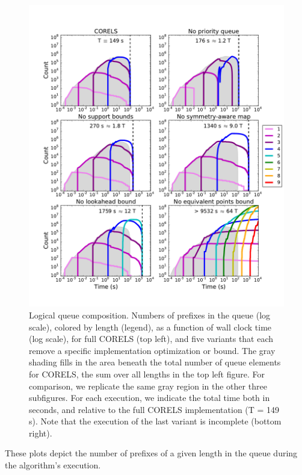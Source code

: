 \begin{figure}[t!]
\begin{center}
\includegraphics[trim={15mm 20mm 5mm 25mm},
width=\textwidth]{figs/kdd_compas_ablation-queue.pdf}
\end{center}
\vspace{-5mm}
\caption{Logical queue composition.
%
Numbers of prefixes in the queue (log scale), colored by length (legend),
as a function of wall clock time (log scale), for full CORELS (top left),
and five variants that each remove a specific implementation optimization or bound.
%
The gray shading fills in the area beneath the total number of
queue elements for CORELS,
\ie the sum over all lengths in the top left figure.
%
For comparison, we replicate the same gray region
in the other three subfigures.
%
For each execution, we indicate the total time both in seconds,
and relative to the full CORELS implementation (T = 149 s).
%
Note that the execution of the last variant is incomplete (bottom right).
}
\label{fig:queue}
\end{figure}
%
These plots depict the number of prefixes of a given length in the queue
during the algorithm's execution.

